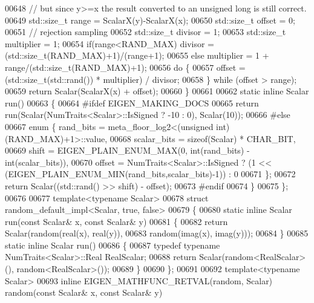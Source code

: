 \begin{DoxyCode}
00648     \textcolor{comment}{// but since y>=x the result converted to an unsigned long is still correct.}
00649     std::size\_t range = ScalarX(y)-ScalarX(x);
00650     std::size\_t offset = 0;
00651     \textcolor{comment}{// rejection sampling}
00652     std::size\_t divisor = 1;
00653     std::size\_t multiplier = 1;
00654     \textcolor{keywordflow}{if}(range<RAND\_MAX) divisor = (std::size\_t(RAND\_MAX)+1)/(range+1);
00655     \textcolor{keywordflow}{else}               multiplier = 1 + range/(std::size\_t(RAND\_MAX)+1);
00656     \textcolor{keywordflow}{do} \{
00657       offset = (std::size\_t(std::rand()) * multiplier) / divisor;
00658     \} \textcolor{keywordflow}{while} (offset > range);
00659     \textcolor{keywordflow}{return} Scalar(ScalarX(x) + offset);
00660   \}
00661 
00662   \textcolor{keyword}{static} \textcolor{keyword}{inline} Scalar run()
00663   \{
00664 \textcolor{preprocessor}{#ifdef EIGEN\_MAKING\_DOCS}
00665     \textcolor{keywordflow}{return} run(Scalar(NumTraits<Scalar>::IsSigned ? -10 : 0), Scalar(10));
00666 \textcolor{preprocessor}{#else}
00667     \textcolor{keyword}{enum} \{ rand\_bits = meta\_floor\_log2<(unsigned int)(RAND\_MAX)+1>::value,
00668            scalar\_bits = \textcolor{keyword}{sizeof}(Scalar) * CHAR\_BIT,
00669            shift = EIGEN\_PLAIN\_ENUM\_MAX(0, \textcolor{keywordtype}{int}(rand\_bits) - int(scalar\_bits)),
00670            offset = NumTraits<Scalar>::IsSigned ? (1 << (EIGEN\_PLAIN\_ENUM\_MIN(rand\_bits,scalar\_bits)-1)) : 
      0
00671     \};
00672     \textcolor{keywordflow}{return} Scalar((std::rand() >> shift) - offset);
00673 \textcolor{preprocessor}{#endif}
00674   \}
00675 \};
00676 
00677 \textcolor{keyword}{template}<\textcolor{keyword}{typename} Scalar>
00678 \textcolor{keyword}{struct }random\_default\_impl<Scalar, true, false>
00679 \{
00680   \textcolor{keyword}{static} \textcolor{keyword}{inline} Scalar run(\textcolor{keyword}{const} Scalar& x, \textcolor{keyword}{const} Scalar& y)
00681   \{
00682     \textcolor{keywordflow}{return} Scalar(random(real(x), real(y)),
00683                   random(imag(x), imag(y)));
00684   \}
00685   \textcolor{keyword}{static} \textcolor{keyword}{inline} Scalar run()
00686   \{
00687     \textcolor{keyword}{typedef} \textcolor{keyword}{typename} NumTraits<Scalar>::Real RealScalar;
00688     \textcolor{keywordflow}{return} Scalar(random<RealScalar>(), random<RealScalar>());
00689   \}
00690 \};
00691 
00692 \textcolor{keyword}{template}<\textcolor{keyword}{typename} Scalar>
00693 \textcolor{keyword}{inline} EIGEN\_MATHFUNC\_RETVAL(random, Scalar) random(\textcolor{keyword}{const} Scalar& x, \textcolor{keyword}{const} Scalar& y)

\end{DoxyCode}
